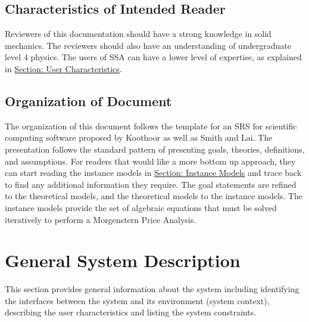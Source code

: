 \documentclass[12pt]{article}
\begin{document}
\subsection{Characteristics of Intended Reader}
\label{Sec:ReaderChars}
Reviewers of this documentation should have a strong knowledge in solid mechanics. The reviewers should also have an understanding of undergraduate level 4 physics. The users of SSA can have a lower level of expertise, as explained in \hyperref[Sec:UserChars]{Section: User Characteristics}.
\subsection{Organization of Document}
\label{Sec:DocOrg}
The organization of this document follows the template for an SRS for scientific computing software proposed by Koothoor as well as Smith and Lai. The presentation follows the standard pattern of presenting goals, theories, definitions, and assumptions. For readers that would like a more bottom up approach, they can start reading the instance models in \hyperref[Sec:IMs]{Section: Instance Models} and trace back to find any additional information they require.
The goal statements are refined to the theoretical models, and the theoretical models to the instance models. The instance models provide the set of algebraic equations that must be solved iteratively to perform a Morgenstern Price Analysis.
\section{General System Description}
\label{Sec:GenSysDesc}
This section provides general information about the system including identifying the interfaces between the system and its environment (system context), describing the user characteristics and listing the system constraints.
\end{document}
